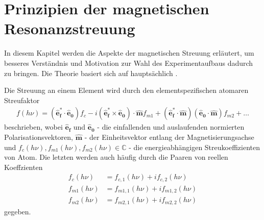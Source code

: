 \chapter{Prinzipien der magnetischen Resonanzstreuung}
\label{text:streuung}
In diesem Kapitel werden die Aspekte der magnetischen Streuung erläutert, um besseres Verständnis und Motivation zur Wahl des Experimentaufbaus dadurch zu bringen. Die Theorie basiert sich auf hauptsächlich \cite{kortright_resonant_2013}. 

\noindent
Die Streuung an einem Element wird durch den elementspezifischen atomaren Streufaktor
\begin{align}
f(h\nu) = (\mathbf{\hat{e}_f^*} \cdot \mathbf{\hat{e}_0})f_c - i(\mathbf{\hat{e}_f^*} \times \mathbf{\hat{e}_0})\cdot\mathbf{\hat{m}}f_{m1}+(\mathbf{\hat{e}_f^*} \cdot \mathbf{\hat{m}})(\mathbf{\hat{e}_0}\cdot\mathbf{\hat{m}})f_{m2} + \dots
\label{eq:atomfaktoren}
\end{align}
beschrieben, wobei $\mathbf{\hat{e}_f}$ und $\mathbf{\hat{e}_0}$ - die einfallenden und auslaufenden normierten Polarisationsvektoren, $\mathbf{\hat{m}}$ - der Einheitsvektor entlang der Magnetisierungsachse und $f_c(h\nu), f_{m1}(h\nu), f_{m2}(h\nu) \in \mathbb{C}$ - die energieabhängigen Streukoeffizienten von Atom. Die letzten werden auch häufig durch die Paaren von reellen Koeffzienten
\begin{equation}
    \begin{split}
    f_c(h\nu) &= f_{c,1}(h\nu) + if_{c,2}(h\nu)\\
    f_{m1}(h\nu) &= f_{m1,1}(h\nu) + if_{m1,2}(h\nu)\\
    f_{m2}(h\nu) &= f_{m2,1}(h\nu) + if_{m2,2}(h\nu)
\end{split}
\label{eq:komplex_paar}
\end{equation}
gegeben.


